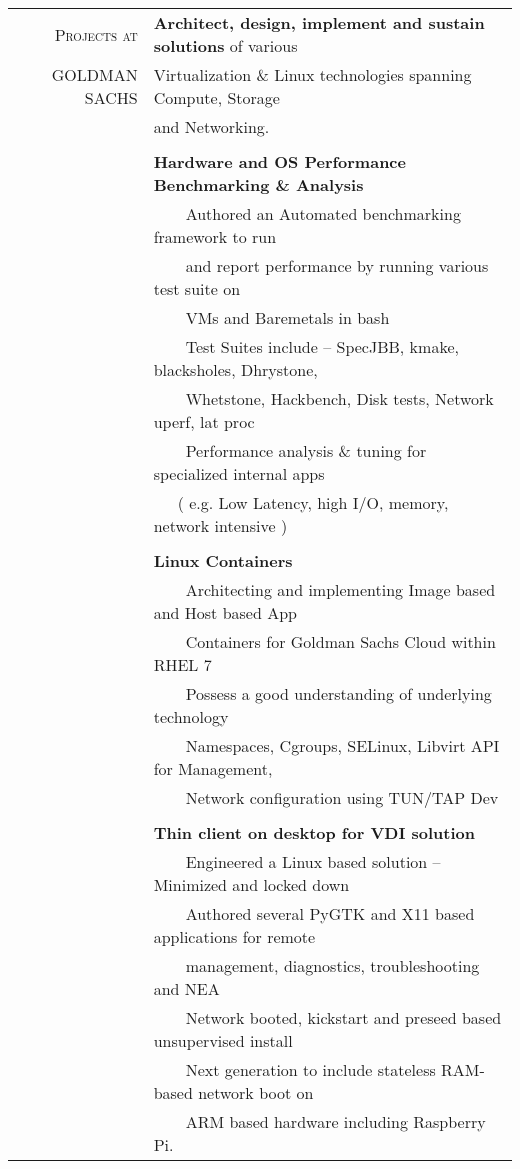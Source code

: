 \documentclass[a4paper,10pt]{article} %
\newcommand{\tabitem}{~~\llap{\textbullet}~~}
\begin{document}
\begin{tabular}{rl}
\textsc{Projects at}  &  \textbf{Architect, design, implement and sustain solutions} of various  \\
\textsc{GOLDMAN SACHS} &  Virtualization \& Linux technologies spanning Compute, Storage \\
& and Networking. \\
&\\
& \textbf{Hardware and OS Performance Benchmarking \& Analysis}\\
& \tabitem Authored an Automated benchmarking framework to run \\
& ~~~~and report performance by running various test suite on \\
& ~~~~VMs and Baremetals in bash\\
& \tabitem Test Suites include – SpecJBB, kmake, blacksholes, Dhrystone, \\
& ~~~~Whetstone, Hackbench, Disk tests, Network uperf, lat proc \\
& \tabitem Performance analysis \& tuning for specialized internal apps \\
& ~~~( e.g. Low Latency, high I/O, memory, network intensive )\\
&\\
& \textbf{Linux Containers} \\
& \tabitem Architecting and implementing Image based and Host based App \\
& ~~~~Containers for Goldman Sachs Cloud within RHEL 7 \\
& \tabitem Possess a good understanding of underlying technology \\
& ~~~~Namespaces, Cgroups, SELinux, Libvirt API for Management, \\
& ~~~~Network configuration using TUN/TAP Dev\\
&\\
& \textbf{Thin client on desktop for VDI solution} \\
& \tabitem Engineered a Linux based solution – Minimized and locked down \\
& \tabitem Authored several PyGTK and X11 based applications for remote \\
& ~~~~management, diagnostics, troubleshooting and NEA \\
& \tabitem Network booted, kickstart and preseed based unsupervised install \\
& ~~~~Next generation to include stateless RAM-based network boot on\\ & ~~~~ARM based hardware including Raspberry Pi. \\

\end{tabular}
\end{document}
